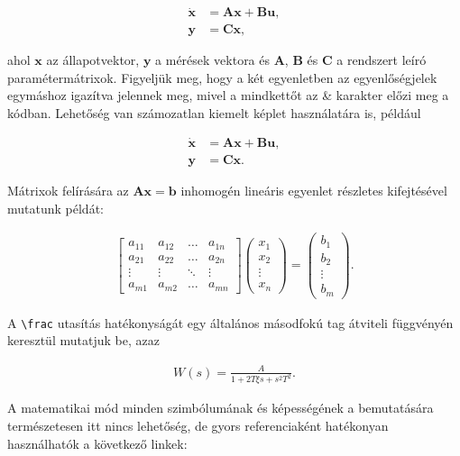 \documentclass[11pt,magyar,a4paper,oneside,]{report}
\begin{document}
\begin{align}
\dot{\mathbf{x}}&=\mathbf{A}\mathbf{x}+\mathbf{B}\mathbf{u},\\
\mathbf{y}&=\mathbf{C}\mathbf{x},
\end{align}

ahol $\mathbf{x}$ az állapotvektor, $\mathbf{y}$ a mérések vektora és
$\mathbf{A}$, $\mathbf{B}$ és $\mathbf{C}$ a rendszert leíró
paramétermátrixok. Figyeljük meg, hogy a két egyenletben az
egyenlőségjelek egymáshoz igazítva jelennek meg, mivel a mindkettőt az
\& karakter előzi meg a kódban. Lehetőség van számozatlan kiemelt képlet
használatára is, például

\begin{align}
\dot{\mathbf{x}}&=\mathbf{A}\mathbf{x}+\mathbf{B}\mathbf{u},\nonumber\\
\mathbf{y}&=\mathbf{C}\mathbf{x}\nonumber.
\end{align}

Mátrixok felírására az $\mathbf{A}\mathbf{x}=\mathbf{b}$ inhomogén
lineáris egyenlet részletes kifejtésével mutatunk példát:

\begin{align}
\begin{bmatrix}
a_{11} & a_{12} & \dots & a_{1n}\\
a_{21} & a_{22} & \dots & a_{2n}\\
\vdots & \vdots & \ddots & \vdots\\
a_{m1} & a_{m2} & \dots & a_{mn}
\end{bmatrix}
\begin{pmatrix}x_1\\x_2\\\vdots\\x_n\end{pmatrix}=
\begin{pmatrix}b_1\\b_2\\\vdots\\b_m\end{pmatrix}.
\end{align}

A \texttt{\textbackslash{}frac} utasítás hatékonyságát egy általános
másodfokú tag átviteli függvényén keresztül mutatjuk be, azaz

\begin{align}
W(s)=\frac{A}{1+2T\xi s+s^2T^2}.
\end{align}

A matematikai mód minden szimbólumának és képességének a bemutatására
természetesen itt nincs lehetőség, de gyors referenciaként hatékonyan
használhatók a következő linkek:
\end{document}
